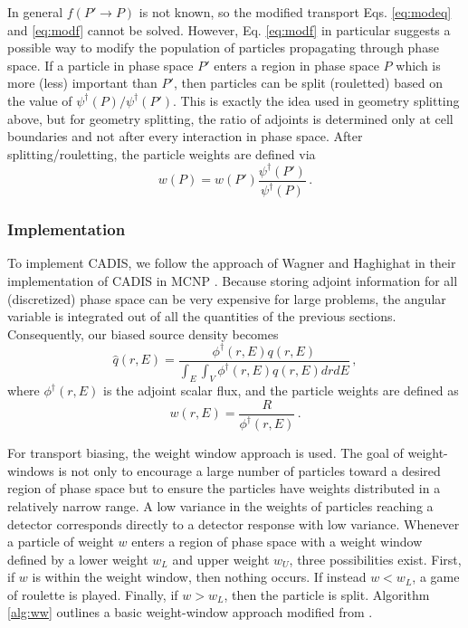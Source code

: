 In general $f(P'\to P)$ is not known, so the modified transport Eqs.
\ref{eq:modeq} and \ref{eq:modf} cannot be solved.  However, Eq. \ref{eq:modf}
in particular suggests a possible way to modify the population of particles
propagating through phase space.  If a particle in phase space $P'$ enters a
region in phase space $P$ which is more (less) important than $P'$, then
particles can be split (rouletted) based on the value of $\psi^\dag (P) /
\psi^\dag (P')$.  This is exactly the idea used in geometry splitting above, but
for geometry splitting, the ratio of adjoints is determined only at cell
boundaries and not after every interaction in phase space.  After
splitting/rouletting, the particle weights are defined via
\begin{equation}
 w(P) = w(P') \frac{\psi^\dag(P')}{\psi^\dag(P)} \, .
\end{equation}

\subsubsection{Implementation}
To implement CADIS, we follow the approach of Wagner and Haghighat in their
implementation of CADIS in MCNP \cite{wagner1998avr}.  Because storing adjoint
information for all (discretized) phase space can be very expensive for large
problems, the angular variable is integrated out of all the quantities of the
previous sections.  Consequently, our biased source density becomes
\begin{equation}
 \hat{q}(r,E) = \frac{\phi^\dag(r,E) q(r,E) }{ \int_E \int_V \phi^\dag(r,E)
q(r,E) dr dE } \, ,
 \label{eq:biassrc2}
\end{equation}
where $\phi^\dag(r,E)$ is the adjoint scalar flux, and the particle weights are
defined as
\begin{equation}
 w(r,E) = \frac{R}{\phi^\dag(r,E)} \, .
\end{equation}

For transport biasing, the weight window approach is used.  The goal of
weight-windows is not only to encourage a large number of particles toward a
desired region of phase space but to ensure the particles have weights
distributed in a relatively narrow range.  A low variance in the weights of
particles reaching a detector corresponds directly to a detector response with
low variance.  Whenever a particle of weight $w$ enters a region of phase space
with a weight window defined by a lower weight $w_L$ and upper weight $w_U$,
three possibilities exist.  First, if $w$ is within the weight window, then
nothing occurs.  If instead $w < w_L$, a game of roulette is played.  Finally,
if $w > w_L$, then the particle is split. Algorithm \ref{alg:ww} outlines a
basic weight-window approach modified from \cite{brown2005fmc}.

